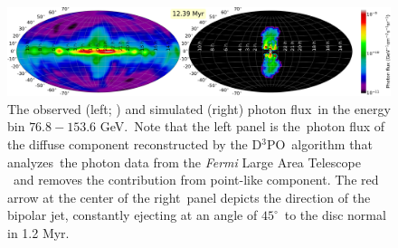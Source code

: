 \documentclass[twocolumn]{aastex631}
\begin{document}




\begin{figure}
  \includegraphics[width=\linewidth]{figures/fig__GammaRay_100e9_1e6_angle_000.png}
  \caption{The observed (left; \citealt{Selig2015}) and simulated (right) photon flux\
           in the energy bin $76.8-153.6$ GeV.\
           Note that the left panel is the\
           photon flux of the diffuse component reconstructed by the D$^3$PO\
           algorithm \citep{Selig2015} that analyzes\
           the photon data from the \textit{Fermi} Large Area Telescope \citep{Atwood2009}\
           and removes the contribution from point-like component.
           The red arrow at the center of the right\
           panel depicts the direction of the bipolar jet, constantly ejecting at an angle of $45^{\circ}$\
           to the disc normal in 1.2 Myr.
  }
  \label{fig__gammaRay-map}
\end{figure}
\end{document}
